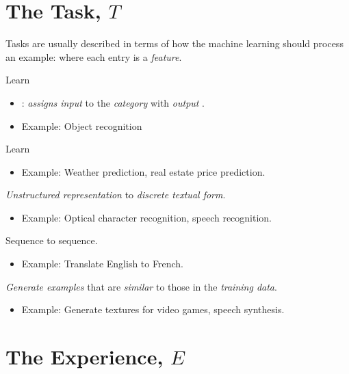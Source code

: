 \documentclass[
	number={1},
	title={Machine Learning Fundamentals}
]{cs584notes}
\begin{document}
\section{The Task, $T$}\label{sec:the-task}
Tasks are usually described in terms of how the machine learning should process an example:  where each entry  is a \emph{feature}.
\begin{description}[font=\color{emphblue}]
	\item[Classification:] Learn 
	\begin{itemize}
		\item {}: \emph{assigns input} to the \emph{category} with \emph{output} .
		\item Example: Object recognition
	\end{itemize}
	\item[Regression:] Learn 
	\begin{itemize}
		\item Example: Weather prediction, real estate price prediction.
	\end{itemize}
	\item[Transcription:] \emph{Unstructured representation} to \emph{discrete textual form}.
	\begin{itemize}
		\item Example: Optical character recognition, speech recognition.
	\end{itemize}
	\item[Machine translation:] Sequence to sequence.
	\begin{itemize}
		\item Example: Translate English to French.
	\end{itemize}
	\item[Synthesis and sampling:] \emph{Generate examples} that are \emph{similar} to those in the \emph{training data}.
	\begin{itemize}
		\item Example: Generate textures for video games, speech synthesis.
	\end{itemize}
\end{description}

\section{The Experience, $E$}\label{sec:the-experience-$e$}
\end{document}
